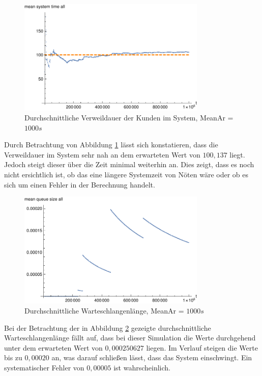 \begin{figure}[htpb]
	\centering
	\includegraphics[width=0.8\textwidth]{abbildungen/2_Phone_VIP/Arrival_1000_Serve_100_dur_1000000_Skip_0/MeanSystemTimeAll.pdf}
	\caption{Durchschnittliche Verweildauer der Kunden im System, MeanAr = $1000s$}
	\label{fig:mean3SystemTime1000}
\end{figure}

Durch Betrachtung von Abbildung \ref{fig:mean3SystemTime1000} lässt sich konstatieren, dass die Verweildauer im System sehr nah an dem erwarteten Wert von $100,137$ liegt. Jedoch steigt dieser über die Zeit minimal weiterhin an. Dies zeigt, dass es noch nicht ersichtlich ist, ob das eine längere Systemzeit von Nöten wäre oder ob es sich um einen Fehler in der Berechnung handelt.

\begin{figure}[htpb]
	\centering
	\includegraphics[width=0.8\textwidth]{abbildungen/2_Phone_VIP/Arrival_1000_Serve_100_dur_1000000_Skip_0/MeanQueueSizeAll.pdf}
	\caption{Durchschnittliche Warteschlangenlänge, MeanAr = $1000s$}
	\label{fig:mean3QueueSize1000}
\end{figure}

Bei der Betrachtung der in Abbildung \ref{fig:mean3QueueSize1000} gezeigte durchschnittliche Warteschlangenlänge fällt auf, dass bei dieser Simulation die Werte durchgehend unter dem erwarteten Wert von $0,000250627$ liegen. Im Verlauf steigen die Werte bis zu $0,00020$ an, was darauf schließen lässt, dass das System einschwingt. Ein systematischer Fehler von $0,00005$ ist wahrscheinlich.

